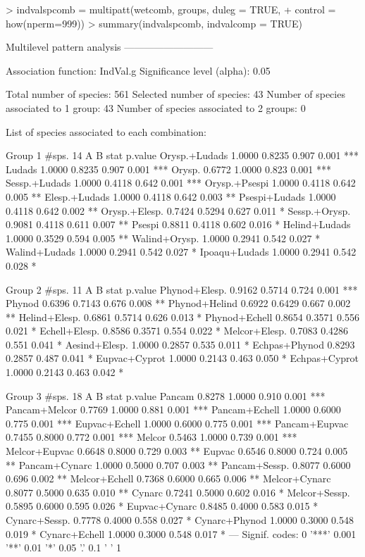\documentclass[11pt,a4paper]{article}
\begin{document}
\begin{Schunk}
\begin{Sinput}
> indvalspcomb = multipatt(wetcomb, groups, duleg = TRUE, 
+                        control = how(nperm=999))
> summary(indvalspcomb, indvalcomp = TRUE)
\end{Sinput}
\begin{Soutput}
 Multilevel pattern analysis
 ---------------------------

 Association function: IndVal.g
 Significance level (alpha): 0.05

 Total number of species: 561
 Selected number of species: 43 
 Number of species associated to 1 group: 43 
 Number of species associated to 2 groups: 0 

 List of species associated to each combination: 

 Group 1  #sps.  14 
                   A      B  stat p.value    
Orysp.+Ludads 1.0000 0.8235 0.907   0.001 ***
Ludads        1.0000 0.8235 0.907   0.001 ***
Orysp.        0.6772 1.0000 0.823   0.001 ***
Sessp.+Ludads 1.0000 0.4118 0.642   0.001 ***
Orysp.+Psespi 1.0000 0.4118 0.642   0.005 ** 
Elesp.+Ludads 1.0000 0.4118 0.642   0.003 ** 
Psespi+Ludads 1.0000 0.4118 0.642   0.002 ** 
Orysp.+Elesp. 0.7424 0.5294 0.627   0.011 *  
Sessp.+Orysp. 0.9081 0.4118 0.611   0.007 ** 
Psespi        0.8811 0.4118 0.602   0.016 *  
Helind+Ludads 1.0000 0.3529 0.594   0.005 ** 
Walind+Orysp. 1.0000 0.2941 0.542   0.027 *  
Walind+Ludads 1.0000 0.2941 0.542   0.027 *  
Ipoaqu+Ludads 1.0000 0.2941 0.542   0.028 *  

 Group 2  #sps.  11 
                   A      B  stat p.value    
Phynod+Elesp. 0.9162 0.5714 0.724   0.001 ***
Phynod        0.6396 0.7143 0.676   0.008 ** 
Phynod+Helind 0.6922 0.6429 0.667   0.002 ** 
Helind+Elesp. 0.6861 0.5714 0.626   0.013 *  
Phynod+Echell 0.8654 0.3571 0.556   0.021 *  
Echell+Elesp. 0.8586 0.3571 0.554   0.022 *  
Melcor+Elesp. 0.7083 0.4286 0.551   0.041 *  
Aesind+Elesp. 1.0000 0.2857 0.535   0.011 *  
Echpas+Phynod 0.8293 0.2857 0.487   0.041 *  
Eupvac+Cyprot 1.0000 0.2143 0.463   0.050 *  
Echpas+Cyprot 1.0000 0.2143 0.463   0.042 *  

 Group 3  #sps.  18 
                   A      B  stat p.value    
Pancam        0.8278 1.0000 0.910   0.001 ***
Pancam+Melcor 0.7769 1.0000 0.881   0.001 ***
Pancam+Echell 1.0000 0.6000 0.775   0.001 ***
Eupvac+Echell 1.0000 0.6000 0.775   0.001 ***
Pancam+Eupvac 0.7455 0.8000 0.772   0.001 ***
Melcor        0.5463 1.0000 0.739   0.001 ***
Melcor+Eupvac 0.6648 0.8000 0.729   0.003 ** 
Eupvac        0.6546 0.8000 0.724   0.005 ** 
Pancam+Cynarc 1.0000 0.5000 0.707   0.003 ** 
Pancam+Sessp. 0.8077 0.6000 0.696   0.002 ** 
Melcor+Echell 0.7368 0.6000 0.665   0.006 ** 
Melcor+Cynarc 0.8077 0.5000 0.635   0.010 ** 
Cynarc        0.7241 0.5000 0.602   0.016 *  
Melcor+Sessp. 0.5895 0.6000 0.595   0.026 *  
Eupvac+Cynarc 0.8485 0.4000 0.583   0.015 *  
Cynarc+Sessp. 0.7778 0.4000 0.558   0.027 *  
Cynarc+Phynod 1.0000 0.3000 0.548   0.019 *  
Cynarc+Echell 1.0000 0.3000 0.548   0.017 *  
---
Signif. codes:  0 '***' 0.001 '**' 0.01 '*' 0.05 '.' 0.1 ' ' 1 
\end{Soutput}
\end{Schunk}
\end{document}
